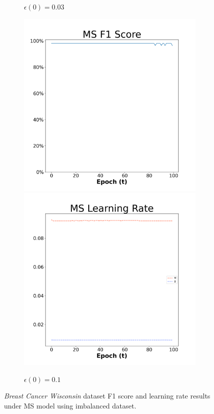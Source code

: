 \begin{figure}[H]
\begin{subfigure}{0.3\textwidth}
  \caption{$\epsilon(0)=0.03$}
\end{subfigure}\hfil %
\begin{subfigure}{0.3\textwidth}
  \includegraphics[width=\linewidth]{images/exper2/breast/MS_0.1_f1.png}
  \includegraphics[width=\linewidth]{images/exper2/breast/MS_0.1_lr.png}
  \caption{$\epsilon(0)=0.1$}
\end{subfigure}

\caption{\textit{Breast Cancer Wisconsin} dataset F1 score and learning rate results under MS model using imbalanced dataset.}
\end{figure}

